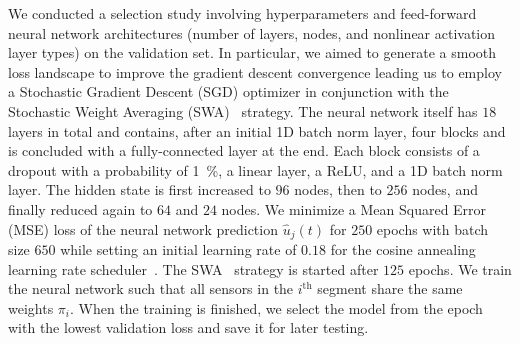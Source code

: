 We conducted a selection study involving hyperparameters and feed-forward neural network architectures (number of layers, nodes, and nonlinear activation layer types) on the validation set. %
In particular, we aimed to generate a smooth loss landscape to improve the gradient descent convergence leading us to employ a Stochastic Gradient Descent (SGD) %
optimizer in conjunction with the Stochastic Weight Averaging (SWA)~\cite{izmailov2018averaging} strategy.
The neural network itself %
has $18$ layers in total and contains, after an initial 1D batch norm layer, four blocks and is concluded with a fully-connected layer at the end. Each block consists of a dropout with a probability of \SI{1}{\percent}, a linear layer, a ReLU, and a 1D batch norm layer. The hidden state is first increased to $96$ nodes, then to $256$ nodes, and finally reduced again to $64$ and $24$ nodes.
We minimize a Mean Squared Error (MSE) loss of the neural network prediction $\hat{u}_j(t)$ for $250$ epochs with batch size $650$ while setting an initial learning rate of $0.18$ for the cosine annealing learning rate scheduler~\cite{loshchilov2016sgdr}. The SWA~\cite{izmailov2018averaging} strategy is started after $125$ epochs.
We train the neural network such that all sensors in the $i^\mathrm{th}$ segment share the same weights $\pi_i$.
When the training is finished, we select the model from the epoch with the lowest validation loss and save it for later testing.

